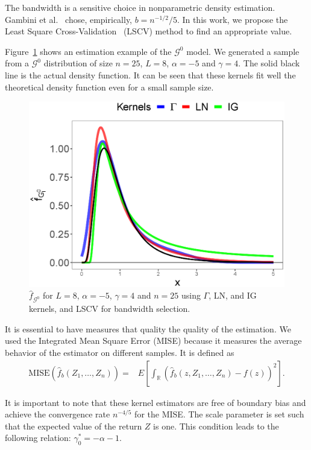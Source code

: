 \documentclass[twocolumn]{svjour3}
\begin{document}
	The bandwidth is a sensitive choice in nonparametric density estimation. 
	Gambini et al.~\cite{gambini2015} chose, empirically, $b=n^{-1/2}/5$. 
	In this work, we propose the Least Square Cross-Validation~\cite{Wu1997} (LSCV) method to find an appropriate value.
	
	Figure~\ref{EstimacionLNyGAyIG} shows an estimation example of the $\mathcal{G}^0$ model. 
	We generated a sample from a $\mathcal{G}^0$ distribution of size $n=25$, $L = 8$, $\alpha=-5$ and $\gamma=4$. 
	The solid black line is the actual density function. 
	It can be seen that these kernels fit well the theoretical density function even for a small sample size.
	
	\begin{figure}[hbt]
		\centering
		\includegraphics[scale=0.35]{../../../Figures/PaperTesis/NucleosGALNyIG.eps}
		\caption{$\widehat{f}_{\mathcal{G}^0}$ for $L=8$, $\alpha=-5$, $\gamma=4$ and $n=25$ using $\Gamma$, LN, and IG kernels, and LSCV for bandwidth selection.}\label{EstimacionLNyGAyIG}
	\end{figure}
	
	It is essential to have measures that quality the quality of the estimation. 
	We used the Integrated Mean Square Error (MISE) because it measures the average behavior of the estimator on different samples. 
	It is defined as
	\begin{align}
	\label{Mise}
	\text{MISE}(\widehat{f}_b(Z_1,\ldots,Z_n))=&E\left[\int_\mathbb{R} (\widehat{f}_b(z,Z_1,\ldots,Z_n)-f(z))^2 \right].
	\end{align}
	
	It is important to note that these kernel estimators are free of boundary bias and achieve the convergence rate $n^{-4/5}$ for the MISE.
	The scale parameter is set such that the expected value of the return $Z$ is one. 
	This condition leads to the following relation: $\gamma_0^*=-\alpha-1$.
	
\end{document}
